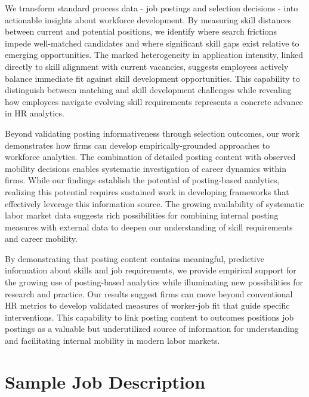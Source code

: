 \documentclass[12pt]{article}
\begin{document}
We transform standard process data - job postings and selection decisions - into actionable insights about workforce development. By measuring skill distances between current and potential positions, we identify where search frictions impede well-matched candidates and where significant skill gaps exist relative to emerging opportunities. The marked heterogeneity in application intensity, linked directly to skill alignment with current vacancies, suggests employees actively balance immediate fit against skill development opportunities. This capability to distinguish between matching and skill development challenges while revealing how employees navigate evolving skill requirements represents a concrete advance in HR analytics.

Beyond validating posting informativeness through selection outcomes, our work demonstrates how firms can develop empirically-grounded approaches to workforce analytics. The combination of detailed posting content with observed mobility decisions enables systematic investigation of career dynamics within firms. While our findings establish the potential of posting-based analytics, realizing this potential requires sustained work in developing frameworks that effectively leverage this information source. The growing availability of systematic labor market data suggests rich possibilities for combining internal posting measures with external data to deepen our understanding of skill requirements and career mobility.

By demonstrating that posting content contains meaningful, predictive information about skills and job requirements, we provide empirical support for the growing use of posting-based analytics while illuminating new possibilities for research and practice. Our results suggest firms can move beyond conventional HR metrics to develop validated measures of worker-job fit that guide specific interventions. This capability to link posting content to outcomes positions job postings as a valuable but underutilized source of information for understanding and facilitating internal mobility in modern labor markets.





\newpage

\printbibliography

\newpage %

\appendix %



\section{Sample Job Description}
\end{document}
